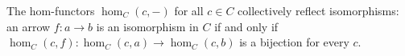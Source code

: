 The hom-functors $\hom_C(c, -)$ for all $c \in C$ collectively reflect isomorphisms: an arrow $f: a \rightarrow b$ is an isomorphism in $C$ if and only if $\hom_C(c, f): \hom_C(c, a) \rightarrow \hom_C(c, b)$ is a bijection for every $c$.